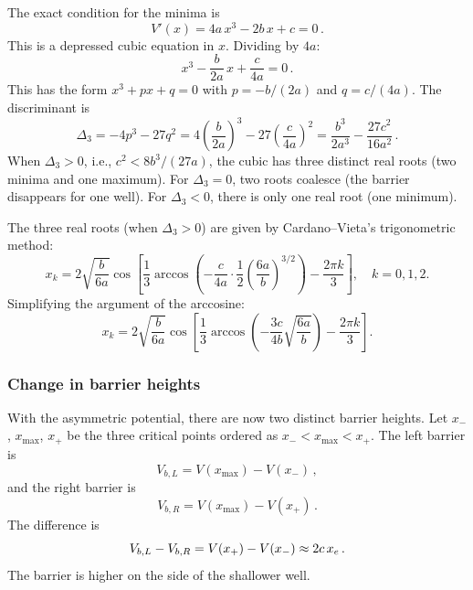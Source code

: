 The exact condition for the minima is
\begin{equation}\label{eq:cubic_roots}
  V'(x) = 4a\,x^3 - 2b\,x + c = 0\,.
\end{equation}
This is a depressed cubic equation in $x$. Dividing by $4a$:
\begin{equation}
  x^3 - \frac{b}{2a}\,x + \frac{c}{4a} = 0\,.
\end{equation}
This has the form $x^3 + px + q = 0$ with $p = -b/(2a)$ and $q = c/(4a)$.
The discriminant is
\begin{equation}
  \Delta_3 = -4p^3 - 27q^2 = 4\left(\frac{b}{2a}\right)^3 - 27\left(\frac{c}{4a}\right)^2
  = \frac{b^3}{2a^3} - \frac{27c^2}{16a^2}\,.
\end{equation}
When $\Delta_3 > 0$, i.e., $c^2 < 8b^3/(27a)$, the cubic has three distinct real roots
(two minima and one maximum). For $\Delta_3 = 0$, two roots coalesce (the barrier
disappears for one well). For $\Delta_3 < 0$, there is only one real root (one minimum).

The three real roots (when $\Delta_3 > 0$) are given by Cardano--Vieta's trigonometric method:
\begin{equation}
  x_k = 2\sqrt{\frac{b}{6a}}\cos\left[\frac{1}{3}\arccos\left(-\frac{c}{4a}\cdot\frac{1}{2}\left(\frac{6a}{b}\right)^{3/2}\right) - \frac{2\pi k}{3}\right],\quad k = 0,1,2.
\end{equation}
Simplifying the argument of the arccosine:
\begin{equation}
  x_k = 2\sqrt{\frac{b}{6a}}\cos\left[\frac{1}{3}\arccos\left(-\frac{3c}{4b}\sqrt{\frac{6a}{b}}\right) - \frac{2\pi k}{3}\right].
\end{equation}

\subsubsection{Change in barrier heights}

With the asymmetric potential, there are now two distinct barrier heights. Let $x_-$, $x_{\max}$, $x_+$ be the three critical points ordered as $x_- < x_{\max} < x_+$. The left barrier is
\begin{equation}
  V_{b,L} = V(x_{\max}) - V(x_-)\,,
\end{equation}
and the right barrier is
\begin{equation}
  V_{b,R} = V(x_{\max}) - V(x_+)\,.
\end{equation}
The difference is
\begin{equation}
  V_{b,L} - V_{b,R} = V(x_+) - V(x_-) \approx 2c\,x_e\,.
\end{equation}
The barrier is higher on the side of the shallower well.

